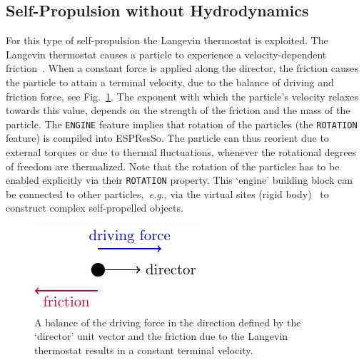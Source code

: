 \documentclass[aip,jcp,reprint,a4paper,onecolumn,amsmath]{revtex4-1}
\newcommand\code{\lstinline}
\newcommand{\es}{\mbox{\textsf{ESPResSo}}\xspace}
\begin{document}
\subsection{\label{sub:langevin}Self-Propulsion without Hydrodynamics}

For this type of self-propulsion the Langevin thermostat is exploited. The
Langevin thermostat causes a particle to experience a velocity-dependent
friction~\cite{UG}. When a constant force is applied along the director, the
friction causes the particle to attain a terminal velocity, due to the balance
of driving and friction force, see Fig.~\ref{fig:balance}. The exponent with
which the particle's velocity relaxes towards this value, depends on the
strength of the friction and the mass of the particle. The \code{ENGINE}
feature implies that rotation of the particles (the \code{ROTATION} feature) is
compiled into \es{}. The particle can thus reorient due to external torques or
due to thermal fluctuations, whenever the rotational degrees of freedom are
thermalized. Note that the rotation of the particles has to be enabled
explicitly via their \code{ROTATION} property. This `engine' building block can
be connected to other particles,~\textit{e.g.}, via the virtual sites (rigid
body)~\cite{UG} to construct complex self-propelled objects\cite{ilse16a}.

\begin{figure}[!htb]
\begin{center}
\includegraphics[scale=1.0]{FIGURES/friction}
\end{center}
\caption{\label{fig:balance}A balance of the driving force in the direction defined by the `director' unit vector and the friction due to the Langevin thermostat results in a constant terminal velocity.}
\end{figure}
\end{document}

